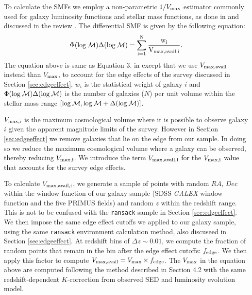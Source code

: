 \documentclass{emulateapj}
\begin{document}
To calculate the SMFs we employ a non-parametric $1/{V_{\rm{max}}}$ estimator commonly used for galaxy luminosity functions and stellar mass functions, as done in \cite{Moustakas:2013aa} and discussed in the review \cite{Johnston:2011aa}. The differential SMF is given by the following equation:
\begin{equation} \label{eq:phi}
\Phi(\rm{log}\: \mathcal{M}) \Delta(\rm{log} \:\mathcal{M}) = \sum\limits_{i=1}^{N} \frac{w_i}{V_{\rm{max,avail},i}}. 
\end{equation}
The equation above is same as Equation 3. in \cite{Moustakas:2013aa} except that we use $V_{\rm{max,avail}}$ instead than $V_{\rm{max}}$, to account for the edge effects of the survey discussed in Section \ref{sec:edgeeffect}. $w_i$ is the statistical weight of galaxy $i$ and $\Phi(\rm{log}\: \mathcal{M}) \Delta(\rm{log}\: \mathcal{M})$ is the number of galaxies ($N$) per unit volume within the stellar mass range $[\rm{log} \:\mathcal{M}, \rm{log} \:\mathcal{M}+\Delta(\rm{log} \:\mathcal{M})]$.

$V_{\rm{max},i}$ is the maximum cosmological volume where it is possible to observe galaxy $i$ given the apparent magnitude limits of the survey. However in Section \ref{sec:edgeeffect} we remove galaxies that lie on the edge from our sample. In doing so we reduce the maximum cosmological volume where a galaxy can be observed, thereby reducing $V_{\rm{max},i}$. We introduce the term $V_{\rm{max,avail},i}$ for the $V_{\rm{max},i}$ value that accounts for the survey edge effects. 

To calculate $V_{\rm{max,avail},i}$, we generate a sample of points with random $RA$, $Dec$ within the window function of our galaxy sample (SDSS-{\em GALEX} window function and the five PRIMUS fields) and random $z$ within the redshift range. This is not to be confused with the \texttt{ransack} sample in Section \ref{sec:edgeeffect}. We then impose the same edge effect cutoffs we applied to our galaxy sample, using the same \texttt{ransack} environment calculation method, also discuseed in Section \ref{sec:edgeeffect}. At redshift bins of $\Delta z \sim 0.01$, we compute the fraction of random points that remain in the bin after the edge effect cutoffs: $f_{\rm{edge}}$. We then apply this factor to compute $V_{\rm{max,avail}} = V_{\rm{max}} \times f_{\rm{edge}}$. The $V_{\rm{max}}$ in the equation above are computed following the method described in \cite{Moustakas:2013aa} Section 4.2 with the same redshift-dependent $K$-correction from observed SED and luminosity evolution model.
\end{document}
